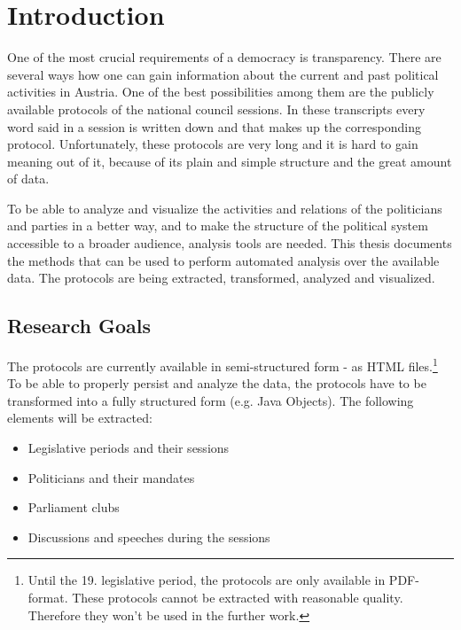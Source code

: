 \chapter{Introduction}
\label{sec:introduction}
One of the most crucial requirements of a democracy is transparency. There are several ways how one can gain information about the current and past political activities in Austria. One of the best possibilities among them are the publicly available protocols of the national council sessions. In these transcripts every word said in a session is written down and that makes up the corresponding protocol. Unfortunately, these protocols are very long and it is hard to gain meaning out of it, because of its plain and simple structure and the great amount of data.

To be able to analyze and visualize the activities and relations of the politicians and parties in a better way, and to make the structure of the political system accessible to a broader audience, analysis tools are needed. This thesis documents the methods that can be used to perform automated analysis over the available data. The protocols are being extracted, transformed, analyzed and visualized.

\section{Research Goals}
The protocols are currently available in semi-structured form - as HTML files.\footnote{Until the 19. legislative period, the protocols are only available in PDF-format. These protocols cannot be extracted with reasonable quality. Therefore they won't be used in the further work.} To be able to properly persist and analyze the data, the protocols have to be transformed into a fully structured form (e.g. Java Objects). The following elements will be extracted:
\begin{itemize}
  \item Legislative periods and their sessions
  \item Politicians and their mandates
  \item Parliament clubs
  \item Discussions and speeches during the sessions
\end{itemize}

